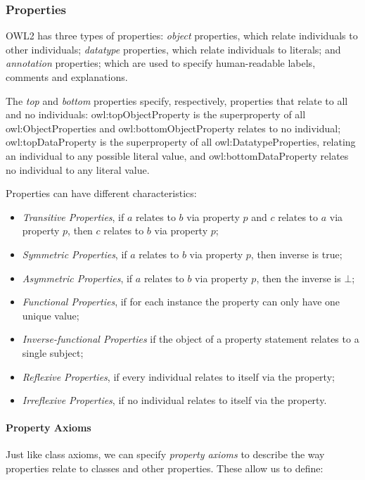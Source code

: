 \subsubsection*{Properties}

\gls{OWL2} has three types of properties: \emph{object} properties, which relate individuals to other individuals; \emph{datatype} properties, which relate individuals to literals; and \emph{annotation} properties; which are used to specify human-readable labels, comments and explanations. 


The \emph{top} and \emph{bottom} properties specify, respectively, properties that relate to all and no individuals: owl:topObjectProperty is the superproperty of all owl:ObjectProperties and owl:bottomObjectProperty relates to no individual; owl:topDataProperty is the superproperty of all owl:DatatypeProperties, relating an individual to any possible literal value, and owl:bottomDataProperty relates no individual to any literal value.

Properties can have different characteristics:
\begin{itemize}
    \item \emph{Transitive Properties}, if $a$ relates to $b$ via property $p$ and $c$ relates to $a$ via property $p$, then $c$ relates to  $b$ via property $p$;
    \item \emph{Symmetric Properties}, if $a$ relates to $b$ via property $p$, then inverse is true;
    \item \emph{Asymmetric Properties}, if $a$ relates to $b$ via property $p$, then the inverse is $\bot$;
    \item \emph{Functional Properties}, if for each instance the property can only have one unique value;
    \item \emph{Inverse-functional Properties} if the object of a property statement relates to a single subject;
    \item \emph{Reflexive Properties}, if every individual relates to itself via the property;
    \item \emph{Irreflexive Properties}, if no individual relates to itself via the property.
\end{itemize}

\paragraph{Property Axioms}

Just like class axioms, we can specify \emph{property axioms} to describe the way properties relate to classes and other properties. These allow us to define:

